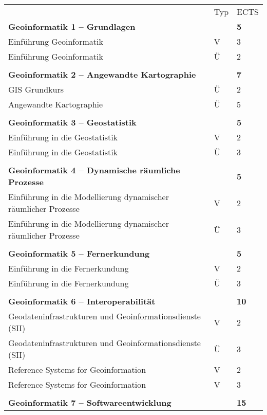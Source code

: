 
\begin{longtable}{p{} p{} p{}}
 & Typ & ECTS \\ 
\textbf{Geoinformatik 1 -- Grundlagen} & & \textbf{5}\\ 
Einführung Geoinformatik & V & 3\\
Einführung Geoinformatik & Ü & 2\\
& &\\
\textbf{Geoinformatik 2 -- Angewandte Kartographie} & & \textbf{7}\\
GIS Grundkurs & Ü & 2\\
Angewandte Kartographie & Ü & 5\\
& &\\
\textbf{Geoinformatik 3 -- Geostatistik} & & \textbf{5}\\
Einführung in die Geostatistik & V & 2\\
Einführung in die Geostatistik & Ü & 3\\
&&\\
\textbf{Geoinformatik 4 -- Dynamische räumliche Prozesse} & &\textbf{5}\\
Einführung in die Modellierung dynamischer räumlicher Prozesse & V & 2 \\
Einführung in die Modellierung dynamischer räumlicher Prozesse & Ü & 3\\
&&\\
\textbf{Geoinformatik 5 -- Fernerkundung} && \textbf{5}\\
Einführung in die Fernerkundung & V & 2\\
Einführung in die Fernerkundung & Ü & 3\\
&&\\
\textbf{Geoinformatik 6 -- Interoperabilität}&& \textbf{10}\\
Geodateninfrastrukturen und Geoinformationsdienste (SII) & V & 2\\
Geodateninfrastrukturen und Geoinformationsdienste (SII) & Ü & 3\\
Reference Systems for Geoinformation & V & 2\\
Reference Systems for Geoinformation & V & 3\\
&&\\
\textbf{Geoinformatik 7 -- Softwareentwicklung}&& \textbf{15}\\

\end{longtable}

